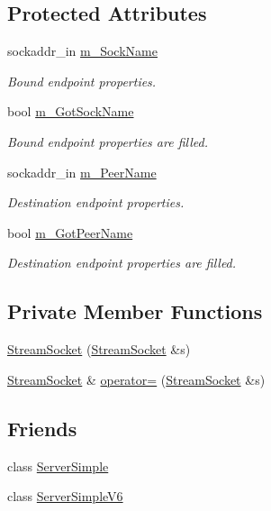 \subsection*{Protected Attributes}
\begin{DoxyCompactItemize}
\item 
sockaddr\+\_\+in \hyperlink{classStreamSocket_a3d9ba37dc44b6ebcbb836f1aeb90ec74}{m\+\_\+\+Sock\+Name}
\begin{DoxyCompactList}\small\item\em Bound endpoint properties. \end{DoxyCompactList}\item 
bool \hyperlink{classStreamSocket_a4f019df008ee69c34332f0e08c68d746}{m\+\_\+\+Got\+Sock\+Name}
\begin{DoxyCompactList}\small\item\em Bound endpoint properties are filled. \end{DoxyCompactList}\item 
sockaddr\+\_\+in \hyperlink{classStreamSocket_a4ab3bf06cf2d7866f36091258d3bd20a}{m\+\_\+\+Peer\+Name}
\begin{DoxyCompactList}\small\item\em Destination endpoint properties. \end{DoxyCompactList}\item 
bool \hyperlink{classStreamSocket_a14305f0d399b0b4bab1b8e1b8fa99844}{m\+\_\+\+Got\+Peer\+Name}
\begin{DoxyCompactList}\small\item\em Destination endpoint properties are filled. \end{DoxyCompactList}\end{DoxyCompactItemize}
\subsection*{Private Member Functions}
\begin{DoxyCompactItemize}
\item 
\hyperlink{classStreamSocket_a11756527c7644ee85bc2debfd8aef576}{Stream\+Socket} (\hyperlink{classStreamSocket}{Stream\+Socket} \&s)
\item 
\hyperlink{classStreamSocket}{Stream\+Socket} \& \hyperlink{classStreamSocket_a4b78db9579afcfe387af3335c632ba49}{operator=} (\hyperlink{classStreamSocket}{Stream\+Socket} \&s)
\end{DoxyCompactItemize}
\subsection*{Friends}
\begin{DoxyCompactItemize}
\item 
class \hyperlink{classStreamSocket_afa2b19845876e6ba2e47d2393147ff4b}{Server\+Simple}
\item 
class \hyperlink{classStreamSocket_ad693c1bdff496f6dc8b4268108014bf2}{Server\+Simple\+V6}
\end{DoxyCompactItemize}
